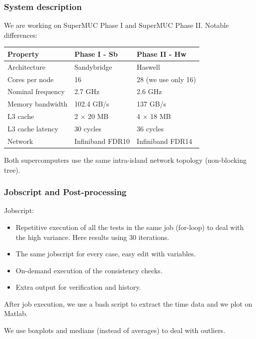 \documentclass[10pt, compress]{beamer}
\begin{document}
\begin{frame}
  \frametitle{System description}
  We are working on SuperMUC Phase I and SuperMUC Phase II.
  Notable differences:
    \begin{table}
    \begin{tabular}{lll}
      \toprule
      Property & Phase I - Sb & Phase II - Hw\\
      \midrule
        Architecture & Sandybridge & Haswell \\
        Cores per node & 16 & 28 (we use only 16) \\
        Nominal frequency & 2.7 GHz & 2.6 GHz \\
        Memory bandwidth & 102.4 GB/s & 137 GB/s \\
        L3 cache & 2 $\times$ 20 MB & 4 $\times$ 18 MB \\
        L3 cache latency & 30 cycles & 36 cycles \\
        Network & Infiniband FDR10 & Infiniband FDR14 \\
      \bottomrule
    \end{tabular}
  \end{table}
 Both supercomputers use the same intra-island network topology (non-blocking tree).

\end{frame}

\begin{frame}
  \frametitle{Jobscript and Post-processing}
  Jobscript:
  \begin{itemize}
  \item Repetitive execution of all the tests in the same job (for-loop) to deal with the high variance. Here results using 30 iterations.
  \item The same jobscript for every case, easy edit with variables.
  \item On-demand execution of the consistency checks.
  \item Extra output for verification and history.
  \end{itemize}
  After job execution, we use a bash script to extract the time data and we plot on Matlab.
  
  We use boxplots and medians (instead of averages) to deal with outliers.
\end{frame}
\end{document}
